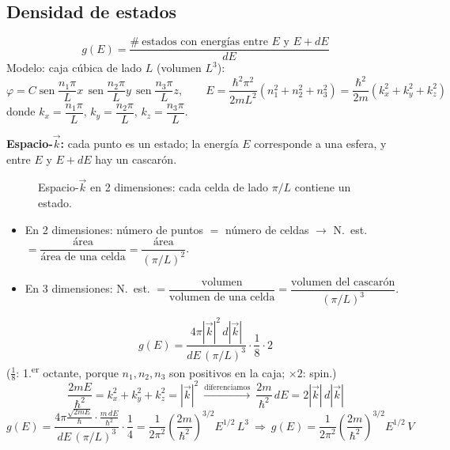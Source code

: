 \documentclass[11pt,a4paper]{article}
\DeclareMathOperator{\sen}{sen}
\begin{document}
\subsection{Densidad de estados}
\[
g(E)=\frac{\#\ \text{estados con energías entre }E\text{ y }E+dE}{dE}
\]
Modelo: caja cúbica de lado $L$ (volumen $L^3$):
\[
\varphi=C\sen\frac{n_1\pi}{L}x\,\sen\frac{n_2\pi}{L}y\,\sen\frac{n_3\pi}{L}z,\qquad
E=\frac{\hbar^2\pi^2}{2mL^2}(n_1^2+n_2^2+n_3^2)=\frac{\hbar^2}{2m}(k_x^2+k_y^2+k_z^2)
\]
donde $k_x=\dfrac{n_1\pi}{L}$, $k_y=\dfrac{n_2\pi}{L}$, $k_z=\dfrac{n_3\pi}{L}$.

\textbf{Espacio-$\vec k$:} cada punto es un estado; la energía $E$ corresponde a una esfera, y entre $E$ y $E+dE$ hay un cascarón.

\begin{figure}[H]
\centering
{}
\caption{Espacio-$\vec k$ en 2 dimensiones: cada celda de lado $\pi/L$ contiene un estado.}
\end{figure}

\begin{itemize}
  \item En 2 dimensiones: número de puntos $=$ número de celdas $\rightarrow$ N.~est. $=\dfrac{\text{área}}{\text{área de una celda}}=\dfrac{\text{área}}{(\pi/L)^2}$.
  \item En 3 dimensiones: N.~est. $=\dfrac{\text{volumen}}{\text{volumen de una celda}}=\dfrac{\text{volumen del cascarón}}{(\pi/L)^3}$.
\end{itemize}
\[
g(E)=\frac{4\pi|\vec k|^2\,d|\vec k|}{dE\,(\pi/L)^3}\cdot\frac18\cdot2
\]
($\tfrac18$: 1.\textsuperscript{er} octante, porque $n_1,n_2,n_3$ son positivos en la caja; $\times2$: spin.)
\[
\frac{2mE}{\hbar^2}=k_x^2+k_y^2+k_z^2=|\vec k|^2\ \xrightarrow{\text{diferenciamos}}\ \frac{2m}{\hbar^2}\,dE=2|\vec k|\,d|\vec k|
\]
\[
g(E)=\frac{4\pi\frac{\sqrt{2mE}}{\hbar}\cdot\frac{m\,dE}{\hbar^2}}{dE\,(\pi/L)^3}\cdot\frac14
=\frac{1}{2\pi^2}\left(\frac{2m}{\hbar^2}\right)^{3/2}E^{1/2}\,L^3
\ \Rightarrow\
\boxed{g(E)=\frac{1}{2\pi^2}\left(\frac{2m}{\hbar^2}\right)^{3/2}E^{1/2}\,V}
\]
\end{document}
